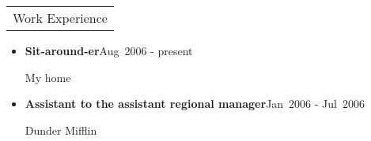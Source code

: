 \documentclass{article}
\renewcommand{\section}[1]{%
  \begin{tabular}{p{\dimexpr\linewidth-2\tabcolsep}}
    \cellcolor{black!10}\large\strut #1
  \end{tabular}%
}
\newcommand{\heading}[2][\relax]{\textbf{#2}\hfill#1\par\nobreak}
\begin{document}
\section{Work Experience}

\begin{itemize}
  \item \heading[Aug~2006 - present]{Sit-around-er}
    My home

  \item \heading[Jan~2006 - Jul~2006]{Assistant to the assistant regional manager}
    Dunder Mifflin
\end{itemize}
\end{document}

